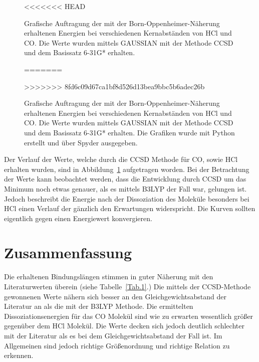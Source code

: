 \begin{figure}[H]
<<<<<<< HEAD
\caption{Grafische Auftragung der mit der Born-Oppenheimer-Näherung erhaltenen Energien bei verschiedenen Kernabständen von HCl und CO. Die Werte wurden mittels GAUSSIAN mit der Methode CCSD und dem Basissatz 6-31G* erhalten.}
=======
\caption{Grafische Auftragung der mit der Born-Oppenheimer-Näherung erhaltenen Energien bei verschiedenen Kernabständen von HCl und CO. Die Werte wurden mittels GAUSSIAN mit der Methode CCSD und dem Basissatz 6-31G* erhalten. Die Grafiken wurde mit Python erstellt und über Spyder ausgegeben.}
>>>>>>> 8fd6c09d67ca1bf8d526d13bea9bbc5b6adec26b


	\label{HCl_CCSD}
\end{figure}


Der Verlauf der Werte, welche durch die CCSD Methode für CO, sowie HCl erhalten wurden, sind in Abbildung~\ref{HCl_CCSD} aufgetragen worden. Bei der Betrachtung der Werte kann beobachtet werden, dass die Entwicklung durch CCSD um das Minimum noch etwas genauer, als es mittels B3LYP der Fall war, gelungen ist. Jedoch beschreibt die Energie  nach der Dissoziation des Moleküle besonders bei HCl einen Verlauf der gänzlich den Erwartungen widerspricht. Die Kurven sollten eigentlich gegen einen Energiewert konvergieren. 


\section{Zusammenfassung}

Die erhaltenen Bindungslängen stimmen in guter Näherung mit den Literaturwerten überein (siehe Tabelle~\ref{Tab.1}.) 
Die mittels der CCSD-Methode gewonnenen Werte nähern sich besser an den Gleichgewichtsabstand der Literatur an als die mit der B3LYP Methode. Die ermittelten Dissoziationsenergien für das CO Molekül sind wie zu erwarten wesentlich größer gegenüber dem HCl Molekül. Die Werte decken sich jedoch deutlich schlechter mit der Literatur als es bei dem Gleichgewichtsabstand der Fall ist. Im Allgemeinen sind jedoch richtige Größenordnung und richtige Relation zu erkennen.



 
 






%

